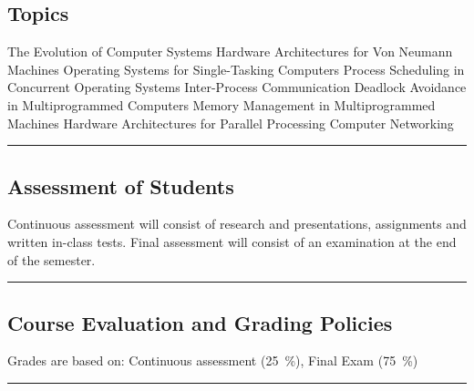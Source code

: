 
\subsection*{Topics}
\begin{outline}
    \1 The Evolution of Computer Systems
    \1 Hardware Architectures for Von Neumann Machines
    \1 Operating Systems for Single-Tasking Computers
    \1 Process Scheduling in Concurrent Operating Systems
    \1 Inter-Process Communication
    \1 Deadlock Avoidance in Multiprogrammed Computers
    \1 Memory Management in Multiprogrammed Machines
    \1 Hardware Architectures for Parallel Processing
    \1 Computer Networking
\end{outline}
\vspace{2ex} \hrule\vspace{2ex}

\subsection*{Assessment of Students}
\begin{outline}
    \1 Continuous assessment will consist of research and presentations, assignments and  written in-class tests.
    \1 Final assessment will consist of an examination at the end of the semester.
\end{outline}
\vspace{2ex}\hrule\vspace{2ex}

\subsection*{Course Evaluation and Grading Policies}
Grades are based on:
Continuous assessment (\qty{25}{\percent}),
Final Exam (\qty{75}{\percent})
\vspace{2ex}\hrule\vspace{2ex}

